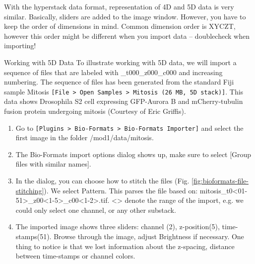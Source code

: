 With the hyperstack data format, representation of 4D and 5D data is very similar. Basically, sliders are added to the image window. However, you have to keep the order of dimensions in mind. Common dimension order is XYCZT, however this order might be different when you import data -- doublecheck when importing!

\begin{taskbox}{Working with 5D Data}
To illustrate working with 5D data, we will import a sequence of files that are labeled with \_t000\_z000\_c000 and increasing numbering. The sequence of files has been generated from the standard Fiji sample Mitosis \texttt{[File > Open Samples > Mitosis (26 MB, 5D stack)]}. This data shows Drosophila S2 cell expressing GFP-Aurora B and mCherry-tubulin fusion protein undergoing mitosis (Courtesy of Eric Griffis).

\begin{enumerate}
	\item Go to \texttt{[Plugins > Bio-Formats > Bio-Formats Importer]} and select the first image in the folder /mod1/data/mitosis.
	\item The Bio-Formats import options dialog shows up, make sure to select [Group files with similar names].
	\item In the dialog, you can choose how to stitch the files (Fig. \ref{fig:bioformats-file-stitching}). We select Pattern. This parses the file based on: mitosis\_t0<01-51>\_z00<1-5>\_c00<1-2>.tif. <> denote the range of the import, e.g. we could only select one channel, or any other substack.
	
	\begin{minipage}[t]{\linewidth}
		\begin{center}
		\medskip
		\label{fig:bioformats-file-stitching}
		\end{center}
	\end{minipage}
	
	\item The imported image shows three sliders: channel (2), z-position(5), time-stamps(51). Browse through the image, adjust Brightness if necessary. One thing to notice is that we lost information about the z-spacing, distance between time-stamps or channel colors.
\end{enumerate}

\end{taskbox}

